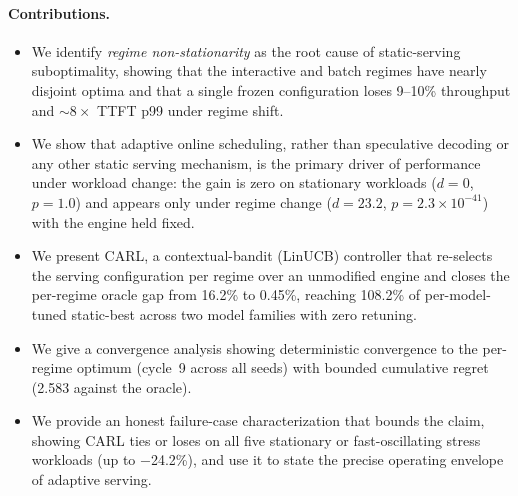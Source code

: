 \paragraph{Contributions.}
\begin{itemize}
  \item We identify \emph{regime non-stationarity} as the root cause of
    static-serving suboptimality, showing that the interactive and batch
    regimes have nearly disjoint optima and that a single frozen
    configuration loses 9--10\% throughput and $\sim$$8\times$ TTFT p99
    under regime shift.
  \item We show that adaptive online scheduling, rather than speculative
    decoding or any other static serving mechanism, is the primary
    driver of performance under workload change: the gain is zero on
    stationary workloads ($d=0$, $p=1.0$) and appears only under regime
    change ($d=23.2$, $p=2.3\times10^{-41}$) with the engine held fixed.
  \item We present CARL, a contextual-bandit (LinUCB) controller that
    re-selects the serving configuration per regime over an unmodified
    engine and closes the per-regime oracle gap from 16.2\% to 0.45\%,
    reaching 108.2\% of per-model-tuned static-best across two model
    families with zero retuning.
  \item We give a convergence analysis showing deterministic convergence
    to the per-regime optimum (cycle~9 across all seeds) with bounded
    cumulative regret (2.583 against the oracle).
  \item We provide an honest failure-case characterization that bounds
    the claim, showing CARL ties or loses on all five stationary or
    fast-oscillating stress workloads (up to $-$24.2\%), and use it to
    state the precise operating envelope of adaptive serving.
\end{itemize}
